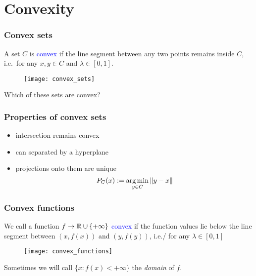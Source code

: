 \documentclass{beamer}
\begin{document}
\section{Convexity}%
\label{sec:}

\begin{frame}
  \frametitle{Convex sets}
  A set $C$ is \textcolor{blue}{convex} if the line segment between any two points remains inside $C$, i.e.\ for any $x,y \in C$ and $\lambda\in [0,1]$.
  \begin{figure}[ht]
    \centering
    \texttt{[image: convex\_sets]}
  \end{figure}
  \begin{center}
    Which of these sets are convex?
  \end{center}

\end{frame}

\begin{frame}
  \frametitle{Properties of convex sets}
  \begin{itemize}
    \item intersection remains convex
    \item can separated by a hyperplane
    \item projections onto them are unique
          \begin{equation}
            P_C(x) := \operatorname*{arg\,min}_{y\in C} \Vert y-x \Vert
          \end{equation}
  \end{itemize}
\end{frame}


\begin{frame}
  \frametitle{Convex functions}
  We call a function $f \to \mathbb{R}\cup\{+\infty\}$ \textcolor{blue}{convex} if the function values lie below the line segment between $(x, f(x))$ and $(y, f(y))$, i.e./ for any $\lambda\in [0,1]$
  \begin{figure}[ht]
    \centering
    \texttt{[image: convex\_functions]}
  \end{figure}

  Sometimes we will call $\{x: f(x)< +\infty \}$ the \textit{domain} of $f$.

\end{frame}
\end{document}
